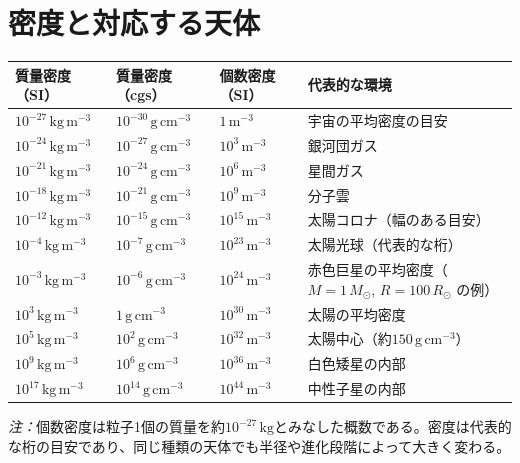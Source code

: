 \section{密度と対応する天体}\label{sec:app-unit-densities}
{\fontsize{9pt}{10.8pt}\selectfont
\begin{tabular}{@{}p{3.45cm}p{3.45cm}p{3.45cm}p{5.0cm}@{}}
\toprule
質量密度（SI） & 質量密度（cgs） & 個数密度（SI） & 代表的な環境 \\
\midrule
$10^{-27}\,\mathrm{kg\,m^{-3}}$ & $10^{-30}\,\mathrm{g\,cm^{-3}}$ & $1\,\mathrm{m^{-3}}$ & 宇宙の平均密度の目安 \\
$10^{-24}\,\mathrm{kg\,m^{-3}}$ & $10^{-27}\,\mathrm{g\,cm^{-3}}$ & $10^{3}\,\mathrm{m^{-3}}$ & 銀河団ガス \\
$10^{-21}\,\mathrm{kg\,m^{-3}}$ & $10^{-24}\,\mathrm{g\,cm^{-3}}$ & $10^{6}\,\mathrm{m^{-3}}$ & 星間ガス \\
$10^{-18}\,\mathrm{kg\,m^{-3}}$ & $10^{-21}\,\mathrm{g\,cm^{-3}}$ & $10^{9}\,\mathrm{m^{-3}}$ & 分子雲 \\
$10^{-12}\,\mathrm{kg\,m^{-3}}$ & $10^{-15}\,\mathrm{g\,cm^{-3}}$ & $10^{15}\,\mathrm{m^{-3}}$ & 太陽コロナ（幅のある目安） \\
$10^{-4}\,\mathrm{kg\,m^{-3}}$ & $10^{-7}\,\mathrm{g\,cm^{-3}}$ & $10^{23}\,\mathrm{m^{-3}}$ & 太陽光球（代表的な桁） \\
$10^{-3}\,\mathrm{kg\,m^{-3}}$ & $10^{-6}\,\mathrm{g\,cm^{-3}}$ & $10^{24}\,\mathrm{m^{-3}}$ & 赤色巨星の平均密度（$M=1\,M_\odot$, $R=100\,R_\odot$ の例） \\
$10^{3}\,\mathrm{kg\,m^{-3}}$ & $1\,\mathrm{g\,cm^{-3}}$ & $10^{30}\,\mathrm{m^{-3}}$ & 太陽の平均密度 \\
$10^{5}\,\mathrm{kg\,m^{-3}}$ & $10^{2}\,\mathrm{g\,cm^{-3}}$ & $10^{32}\,\mathrm{m^{-3}}$ & 太陽中心（約$150\,\mathrm{g\,cm^{-3}}$） \\
$10^{9}\,\mathrm{kg\,m^{-3}}$ & $10^{6}\,\mathrm{g\,cm^{-3}}$ & $10^{36}\,\mathrm{m^{-3}}$ & 白色矮星の内部 \\
$10^{17}\,\mathrm{kg\,m^{-3}}$ & $10^{14}\,\mathrm{g\,cm^{-3}}$ & $10^{44}\,\mathrm{m^{-3}}$ & 中性子星の内部 \\
\bottomrule
\end{tabular}
}
\par\noindent\footnotesize\textit{注：}個数密度は粒子1個の質量を約$10^{-27}\,\mathrm{kg}$とみなした概数である。密度は代表的な桁の目安であり、同じ種類の天体でも半径や進化段階によって大きく変わる。\normalsize

